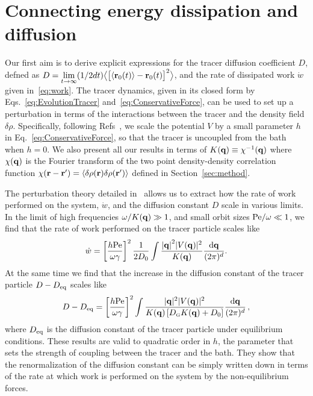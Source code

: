 \documentclass[pre, superscriptaddress, twocolumn,pre]{revtex4-1}
\newcommand{\dd}{\text{d}}
\begin{document}
\section{Connecting energy dissipation and diffusion}\label{sec:diff}

Our first aim is to derive explicit expressions for the tracer diffusion coefficient $D$, defned as $D = \underset{t\to\infty}{\lim} (1/2dt) \big\langle \big[\langle{\bf r}_0(t)\rangle-{\bf r}_0(t)\big]^2 \big\rangle$, and the rate of dissipated work $\dot w$ given in~\eqref{eq:work}. The tracer dynamics, given in its closed form by Eqs.~\eqref{eq:EvolutionTracer} and~\eqref{eq:ConservativeForce}, can be used to set up a perturbation in terms of the interactions between the tracer and the density field $\delta\rho$. Specifically, following Refs~\cite{Demery2011, Demery2014}, we scale the potential $V$ by a small parameter $h$ in Eq.~\eqref{eq:ConservativeForce}, so that the tracer is uncoupled from the bath when $h=0$. We also present all our results in terms of $K({\bf q}) \equiv \chi^{-1}({\bf q})$ where $\chi({\bf q})$ is the Fourier transform of the two point density-density correlation function $\chi({\bf r}-{\bf r}')= \langle \delta \rho({\bf r}) \delta \rho ({\bf r}')\rangle$ defined in Section~\ref{sec:method}. 


The perturbation theory detailed in~\cite{Supplemental} allows us to extract how the rate of work performed on the system, $\dot w$, and the diffusion constant $D$ scale in various limits. In the limit of high frequencies $\omega/K({\bf q})\gg 1$, and small orbit sizes ${\rm Pe}/\omega \ll 1$, we find that the rate of work performed on the tracer particle scales like
\begin{equation}\label{eq:workscalingsmall}
	\dot w  = \left[\frac{h{\rm Pe}}{\omega\gamma}\right]^2 \frac{1}{2D_0}\int \frac{ {|{\bf q}|}^2 |V({\bf q})|^2}{K({\bf q})} \frac{\dd{\bf q}}{(2\pi)^d} .
\end{equation}
At the same time we find that the increase in the diffusion constant of the tracer particle $D-D_{\rm eq}$ scales like 
\begin{equation}\label{eq:Dscaling}
	D-D_{\rm eq} = \left[\frac{h{\rm Pe}}{\omega\gamma}\right]^2 \int \dfrac{|{\bf q}|^2 |V({\bf q})|^2 } { K({\bf q}) \left[ D_\text{\tiny G}  K({\bf q}) +  D_0 \right]} \frac{\dd{\bf q}}{(2\pi)^d} \,,
\end{equation}
where $D_{\rm eq}$ is the diffusion constant of the tracer particle under equilibrium conditions. 
These results are valid to quadratic order in $h$, the parameter that sets the strength of coupling between the tracer and the bath. They show that the renormalization of the diffusion constant can be simply written down in terms of the rate at which work is performed on the system by the non-equilibrium forces. 
\end{document}
